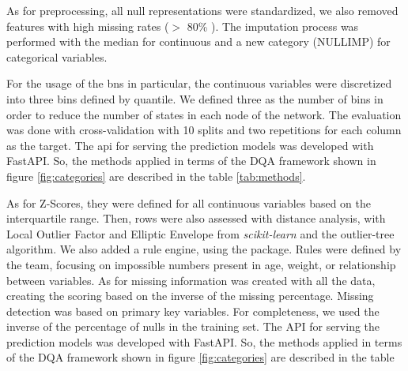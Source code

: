 As for preprocessing, all null representations were standardized, we also removed features with high missing rates ($>$ 80\% ). The imputation process was performed with the median for continuous and a new category (NULLIMP) for categorical variables. 

For the usage of the \acp{bn} in particular, the continuous variables were discretized into three bins defined by quantile. We defined three as the number of bins in order to reduce the number of states in each node of the network. The evaluation was done with cross-validation with 10 splits and two repetitions for each column as the target.
The \ac{api} for serving the prediction models was developed with FastAPI. So, the methods applied in terms of the DQA framework shown in figure \ref{fig:categories} are described in the table \ref{tab:methods}.


As for  Z-Scores, they were defined for all continuous variables based on the interquartile range. Then, rows were also assessed with distance analysis, with Local Outlier Factor and Elliptic Envelope from \textit{scikit-learn} and the outlier-tree algorithm. We also added a rule engine, using the  package. Rules were defined by the team, focusing on impossible numbers present in age, weight, or relationship between variables. As for missing information was created with all the data, creating the scoring based on the inverse of the missing percentage. Missing detection was based on primary key variables. For completeness, we used the inverse of the percentage of nulls in the training set.
The API for serving the prediction models was developed with FastAPI. So, the methods applied in terms of the DQA framework shown in figure \ref{fig:categories} are described in the table 

